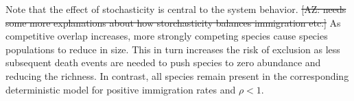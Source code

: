 \documentclass[9pt,twocolumn,twoside,lineno]{pnas-new}
\begin{document}
Note that the effect of stochasticity is central to the system behavior. \st{[AZ: needs some more explanations about how storchasticity balances immigration etc.]} 
As competitive overlap increases, more strongly competing species cause species populations to reduce in size.
This in turn increases the risk of exclusion as less subsequent death events are needed to push species to zero abundance and reducing the richness.
In contrast, all species remain present in the corresponding deterministic model for positive immigration rates and $\rho<1$.




\end{document}
